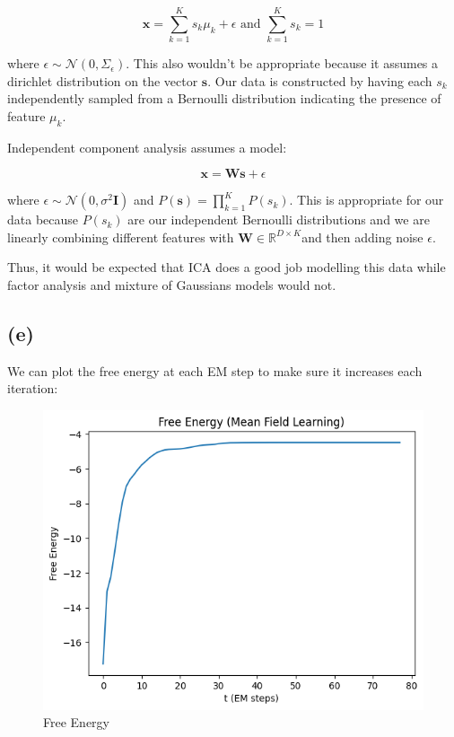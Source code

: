 \documentclass[12pt]{article}
\begin{document}
\[\textbf{x} = \sum_{k=1}^K s_k \mu_k + \epsilon \text{ and } \sum_{k=1}^K s_k = 1\]

where $\epsilon \sim \mathcal{N}(0, \Sigma_{\epsilon})$. This also wouldn't be appropriate because it assumes a dirichlet distribution on the vector $\textbf{s}$. Our data is constructed by having each $s_k$ independently sampled from a Bernoulli distribution indicating the presence of feature $\mu_k$.

Independent component analysis assumes a model:

\[\textbf{x} = \textbf{W}\textbf{s} + \epsilon\]

where $\epsilon \sim \mathcal{N}(0, \sigma^2\textbf{I})$ and $P(\textbf{s}) = \prod_{k=1}^K P(s_k)$. This is appropriate for our data because $P(s_k)$ are our independent Bernoulli distributions and we are linearly combining different features with $\textbf{W} \in \mathbb{R}^{D \times K}$and then adding noise $\epsilon$.

Thus, it would be expected that ICA does a good job modelling this data while factor analysis and mixture of Gaussians models would not.

\subsection*{(e)}

We can plot the free energy at each EM step to make sure it increases each iteration:

\begin{figure}[h]
\centering
\includegraphics[scale=0.4]{outputs/q3/f-free-energy}
\caption{Free Energy}
\label{fig:3f-free-energy}
\end{figure}
\newpage
\end{document}
